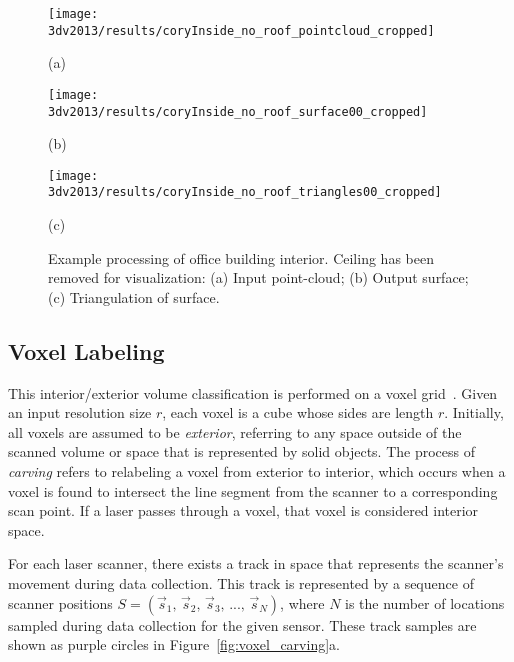 \documentclass[12pt,onecolumn,oneside]{book}
\begin{document}
\begin{figure}[t]

	\begin{minipage}[b]{0.3\linewidth}
	\centerline{\texttt{[image: 3dv2013/results/coryInside\_no\_roof\_pointcloud\_cropped]}}
	\centerline{(a)}\medskip
	\end{minipage}
	\hfill
	\begin{minipage}[b]{0.3\linewidth}
	\centerline{\texttt{[image: 3dv2013/results/coryInside\_no\_roof\_surface00\_cropped]}}
	\centerline{(b)}\medskip
	\end{minipage}
	\hfill
	\begin{minipage}[b]{0.3\linewidth}
	\centerline{\texttt{[image: 3dv2013/results/coryInside\_no\_roof\_triangles00\_cropped]}}
	\centerline{(c)}\medskip
	\end{minipage}

\caption[Example processing of office building interior.]{Example processing of office building interior.  Ceiling has been removed for visualization:  (a) Input point-cloud; (b) Output surface; (c) Triangulation of surface.}
\label{fig:3dv2013_mydesk}
\end{figure}

\subsection{Voxel Labeling}
\label{ssec:voxel_labeling}

This interior/exterior volume classification is performed on a voxel grid~\cite{Turner13}.  Given an input resolution size $r$, each voxel is a cube whose sides are length $r$.  Initially, all voxels are assumed to be {\it exterior}, referring to any space outside of the scanned volume or space that is represented by solid objects.  The process of {\it carving} refers to relabeling a voxel from exterior to interior, which occurs when a voxel is found to intersect the line segment from the scanner to a corresponding scan point.  If a laser passes through a voxel, that voxel is considered interior space.

For each laser scanner, there exists a track in space that represents the scanner's movement during data collection.  This track is represented by a sequence of scanner positions $S = (\vec{s}_{1},\,\vec{s}_{2},\,\vec{s}_{3},\,...,\,\vec{s}_{N})$, where $N$ is the number of locations sampled during data collection for the given sensor.  These track samples are shown as purple circles in Figure~\ref{fig:voxel_carving}a.
\end{document}

